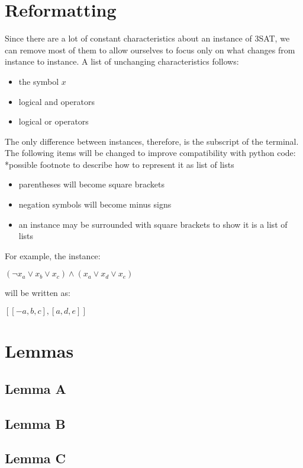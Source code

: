 \documentclass[manuscript]{acmart}
\begin{document}
    \section{Reformatting}

    Since there are a lot of constant characteristics about an instance of 3SAT, 
    we can remove most of them to allow ourselves to focus only on what changes
    from instance to instance. A list of unchanging characteristics follows:
    \begin{itemize}
        \item the symbol $x$
        \item logical and operators
        \item logical or operators
    \end{itemize}
    
    The only difference between instances, therefore, is the subscript of the terminal.
    The following items will be changed to improve compatibility with python code:
    *possible footnote to describe how to represent it as list of lists
    \begin{itemize}
        \item parentheses will become square brackets
        \item negation symbols will become minus signs
        \item an instance may be surrounded with square brackets to show it is a list of lists
    \end{itemize}
   
    For example, the instance:
    
    $(\neg x_a \lor x_b \lor x_c) \land (x_a \lor x_d \lor x_e)$

    will be written as:

    $[[-a, b, c], [a, d, e]]$


    \section{Lemmas}

    \subsection{Lemma A}
    \subsection{Lemma B}
    \subsection{Lemma C}
\end{document}
